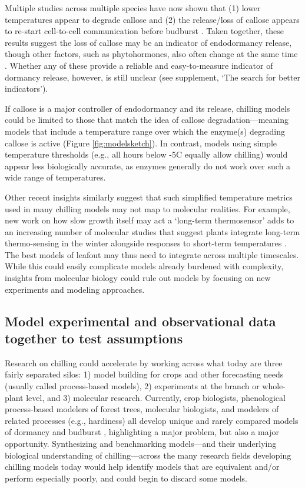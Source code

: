 \documentclass[11pt]{article}
\begin{document}
Multiple studies across multiple species have now shown that (1) lower temperatures appear to degrade callose and (2) the release/loss of callose appears to re-start cell-to-cell communication before budburst \citep{vanderschoot2014,pandey2026variable}. Taken together, these results suggest the loss of callose may be an indicator of endodormancy release, though other factors, such as  phytohormones, also often change at the same time \citep[][]{rinne2018,tylewicz2018photoperiodic,pan2021aba,andre2022populus}. Whether any of these provide a reliable and easy-to-measure indicator of dormancy release, however, is still unclear (see supplement, `The search for better indicators').

If callose is a major controller of endodormancy and its release, chilling models could be limited to those that match the idea of callose degradation---meaning models that include a temperature range over which the enzyme(s) degrading callose is active (Figure \ref{fig:modelsketch}). In contrast, models using simple temperature thresholds (e.g., all hours below -5\degree C equally allow chilling) would appear less biologically accurate, as enzymes generally do not work over such a wide range of temperatures. 

Other recent insights similarly suggest that such simplified temperature metrics used in many chilling models may not map to molecular realities. For example, new work on how slow growth itself may act  a `long-term thermosensor' \citep{zhao2020temperature} 
adds to an increasing number of molecular studies that suggest plants integrate long-term thermo-sensing in the winter alongside responses to short-term temperatures \citep{antoniou2021feeling,Satake2022}. The best models of leafout may thus need to integrate across multiple timescales. While this could easily complicate models already burdened with complexity, insights from molecular biology could rule out models by focusing on new experiments and modeling approaches. 

\subsection*{Model experimental and observational data together to test assumptions} 
Research on chilling could accelerate by working across what today are three fairly separated silos: 1) model building for crops and other forecasting needs (usually called process-based models), 2) experiments at the branch or whole-plant level, and 3) molecular research. Currently, crop biologists, phenological process-based modelers of forest trees, molecular biologists, and modelers of related processes (e.g., hardiness) 
all develop unique and rarely compared models of dormancy and budburst \citep[but see][]{kovaleskipreprint}, highlighting a major problem, but also a major opportunity. Synthesizing and benchmarking models---and their underlying biological understanding of chilling---across the many research fields developing chilling models today would help identify models that are equivalent and/or perform especially poorly, and could begin to discard some models.  
\end{document}

